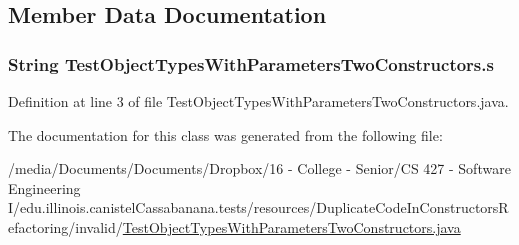 \subsection{Member Data Documentation}
\hypertarget{classTestObjectTypesWithParametersTwoConstructors_a939b5db97988d501db704b560bf43d64}{
\subsubsection[{s}]{\setlength{\rightskip}{0pt plus 5cm}String {\bf TestObjectTypesWithParametersTwoConstructors.s}}}
\label{classTestObjectTypesWithParametersTwoConstructors_a939b5db97988d501db704b560bf43d64}


Definition at line 3 of file TestObjectTypesWithParametersTwoConstructors.java.



The documentation for this class was generated from the following file:\begin{DoxyCompactItemize}
\item 
/media/Documents/Documents/Dropbox/16 -\/ College -\/ Senior/CS 427 -\/ Software Engineering I/edu.illinois.canistelCassabanana.tests/resources/DuplicateCodeInConstructorsRefactoring/invalid/\hyperlink{TestObjectTypesWithParametersTwoConstructors_8java}{TestObjectTypesWithParametersTwoConstructors.java}\end{DoxyCompactItemize}
